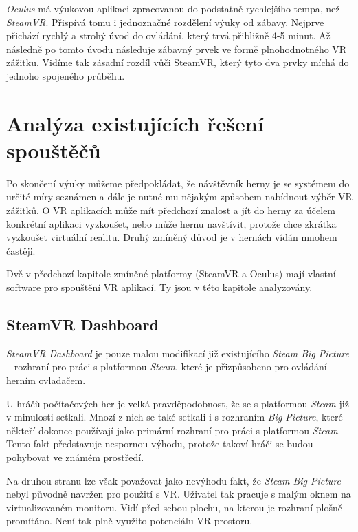 \emph{Oculus} má výukovou aplikaci zpracovanou do podstatně rychlejšího
tempa, než \emph{SteamVR}. Přispívá tomu i jednoznačné rozdělení výuky
od zábavy. Nejprve přichází rychlý a strohý úvod do ovládání, který trvá
přibližně 4-5 minut. Až následně po tomto úvodu následuje zábavný prvek
ve formě plnohodnotného VR zážitku. Vidíme tak zásadní rozdíl vůči
SteamVR, který tyto dva prvky míchá do jednoho spojeného průběhu.

\section{Analýza existujících řešení
spouštěčů}\label{analuxfdza-existujuxedcuxedch-ux159eux161enuxed-spouux161tux11bux10dux16f}

Po skončení výuky můžeme předpokládat, že návštěvník herny je se
systémem do určité míry seznámen a dále je nutné mu nějakým způsobem
nabídnout výběr VR zážitků. O VR aplikacích může mít předchozí znalost a
jít do herny za účelem konkrétní aplikaci vyzkoušet, nebo může hernu
navštívit, protože chce zkrátka vyzkoušet virtuální realitu. Druhý
zmíněný důvod je v hernách vídán mnohem častěji.

Dvě v předchozí kapitole zmíněné platformy (SteamVR a Oculus) mají
vlastní software pro spouštění VR aplikací. Ty jsou v této kapitole
analyzovány.

\subsection{SteamVR Dashboard}\label{steamvr-dashboard}

\emph{SteamVR Dashboard} je pouze malou modifikací již existujícího
\emph{Steam Big Picture} -- rozhraní pro práci s platformou
\emph{Steam}, které je přizpůsobeno pro ovládání herním ovladačem.

U hráčů počítačových her je velká pravděpodobnost, že se s platformou
\emph{Steam} již v minulosti setkali. Mnozí z nich se také setkali i s
rozhraním \emph{Big Picture}, které někteří dokonce používají jako
primární rozhraní pro práci s platformou \emph{Steam}. Tento fakt
představuje nespornou výhodu, protože takoví hráči se budou pohybovat ve
známém prostředí.

Na druhou stranu lze však považovat jako nevýhodu fakt, že \emph{Steam
Big Picture} nebyl původně navržen pro použití s VR. Uživatel tak pracuje s
malým oknem na virtualizovaném monitoru. Vidí před sebou plochu, na
kterou je rozhraní plošně promítáno. Není tak plně využito potenciálu VR
prostoru.

